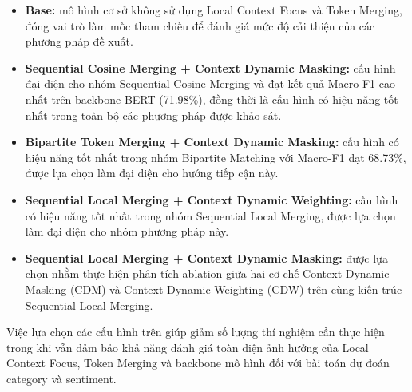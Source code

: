 \begin{itemize}
\item \textbf{Base:} mô hình cơ sở không sử dụng Local Context Focus và Token Merging, đóng vai trò làm mốc tham chiếu để đánh giá mức độ cải thiện của các phương pháp đề xuất.

\item \textbf{Sequential Cosine Merging + Context Dynamic Masking:} cấu hình đại diện cho nhóm Sequential Cosine Merging và đạt kết quả Macro-F1 cao nhất trên backbone BERT (71.98\%), đồng thời là cấu hình có hiệu năng tốt nhất trong toàn bộ các phương pháp được khảo sát.

\item \textbf{Bipartite Token Merging + Context Dynamic Masking:} cấu hình có hiệu năng tốt nhất trong nhóm Bipartite Matching với Macro-F1 đạt 68.73\%, được lựa chọn làm đại diện cho hướng tiếp cận này.

\item \textbf{Sequential Local Merging + Context Dynamic Weighting:} cấu hình có hiệu năng tốt nhất trong nhóm Sequential Local Merging, được lựa chọn làm đại diện cho nhóm phương pháp này.

\item \textbf{Sequential Local Merging + Context Dynamic Masking:} được lựa chọn nhằm thực hiện phân tích ablation giữa hai cơ chế Context Dynamic Masking (CDM) và Context Dynamic Weighting (CDW) trên cùng kiến trúc Sequential Local Merging.
\end{itemize}

Việc lựa chọn các cấu hình trên giúp giảm số lượng thí nghiệm cần thực hiện trong khi vẫn đảm bảo khả năng đánh giá toàn diện ảnh hưởng của Local Context Focus, Token Merging và backbone mô hình đối với bài toán dự đoán category và sentiment.

